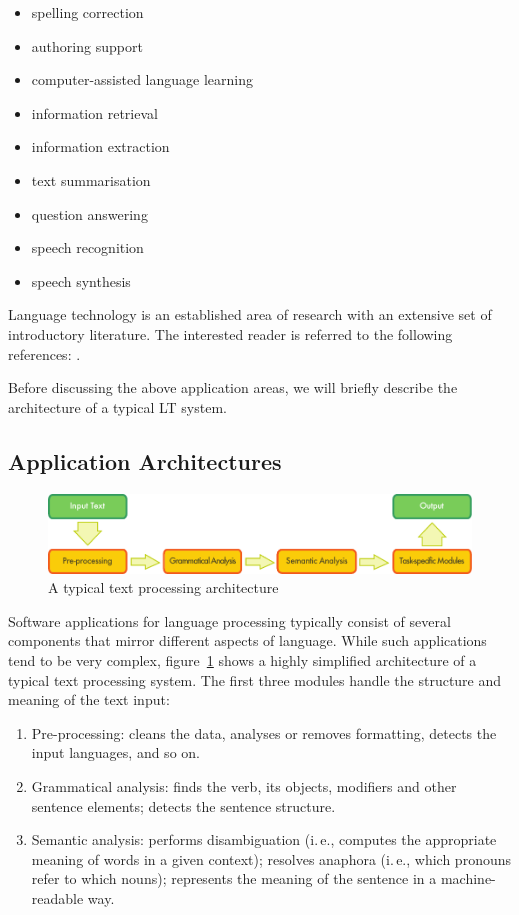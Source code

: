 \begin{multicols}{2}
\begin{itemize}
\item spelling correction
\item authoring support
\item computer-assisted language learning
\item information retrieval 
\item information extraction
\item text summarisation
\item question answering
\item speech recognition 
\item speech synthesis 
\end{itemize}

Language technology is an established area of research with an extensive set of introductory literature. The interested reader is referred to the following references:  \cite{Braasch, jurafsky-martin01, manning-schuetze1, lt-world1, lt-survey1}.

Before discussing the above application areas, we will briefly describe the architecture of a typical LT system.

\subsection{Application Architectures}

\begin{figure}[b]
  \center
  \includegraphics[width=\textwidth]{../_media/english/text_processing_app_architecture}
  \caption{A typical text processing architecture}
\label{fig:textprocessingarch_en}
\end{figure}

Software applications for language processing typically consist of several components that mirror different aspects of language. While such applications tend to be very complex, figure~\ref{fig:textprocessingarch_en} shows a highly simplified architecture of a typical text processing system. The first three modules handle the structure and meaning of the text input:

\begin{enumerate}
\item Pre-processing: cleans the data, analyses or removes formatting, detects the input languages, and so on.
\item Grammatical analysis: finds the verb, its objects, modifiers and other sentence elements; detects the sentence structure.
\item Semantic analysis: performs disambiguation (i.\,e., computes the appropriate meaning of words in a given context); resolves anaphora (i.\,e., which pronouns refer to which nouns); represents the meaning of the sentence in a machine-readable way.
\end{enumerate}


\end{multicols}
